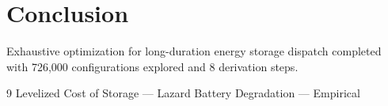 \documentclass[11pt,twocolumn]{article}
\begin{document}
\section{Conclusion}
Exhaustive optimization for long-duration energy storage dispatch completed with 726,000 configurations explored and 8 derivation steps.

\begin{thebibliography}{9}
 Levelized Cost of Storage --- Lazard
 Battery Degradation --- Empirical
\end{thebibliography}
\end{document}
